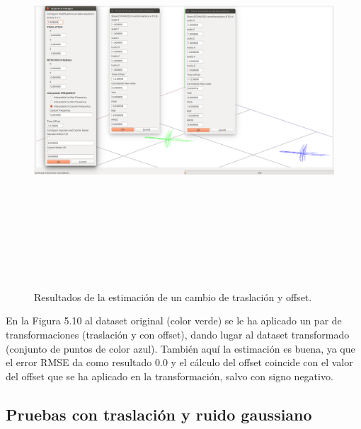\begin{figure}[H]
\begin{center}
\label{fig:opciones de View}\includegraphics[height=14.0cm,width=18.0cm]{img/cap6/Trasla_Offset_abba.png}
\hspace{0.5cm}

\end{center}

\caption{Resultados de la estimación de un cambio de traslación y offset.}
\end{figure}
En la Figura 5.10 al dataset original (color verde) se le ha aplicado un par de transformaciones (traslación y con offset), dando lugar al dataset transformado (conjunto de puntos de color azul). También aquí la estimación es buena, ya que el error RMSE da como resultado 0.0 y el cálculo del offset  coincide con el valor del offset que se ha aplicado en la transformación, salvo con signo negativo.

\subsection{Pruebas con traslación y ruido gaussiano}

